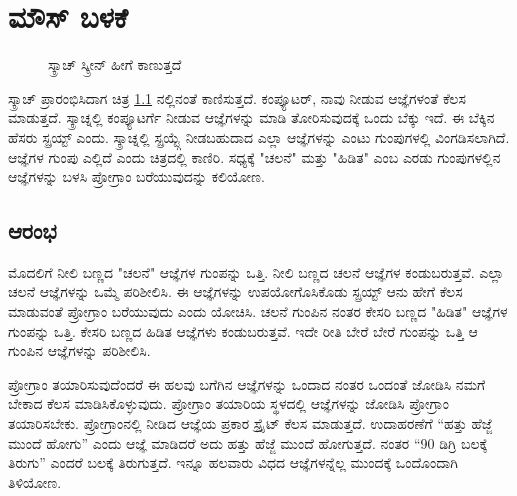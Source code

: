 \chapter{ಮೌಸ್ ಬಳಕೆ}
\begin{center}
\begin{figure}[h]
\caption{ಸ್ಕ್ರಾಚ್ ಸ್ಕ್ರೀನ್ ಹೀಗೆ ಕಾಣುತ್ತದೆ}
\label{ScratchScreen}
\end{figure}
\end{center}

ಸ್ಕ್ರಾಚ್ ಪ್ರಾರಂಭಿಸಿದಾಗ ಚಿತ್ರ \ref{ScratchScreen} ನಲ್ಲಿನಂತೆ ಕಾಣಿಸುತ್ತದೆ. ಕಂಪ್ಯೂಟರ್, ನಾವು ನೀಡುವ ಆಜ್ಞೆಗಳಂತೆ ಕೆಲಸ ಮಾಡುತ್ತದೆ.  ಸ್ಕ್ರಾಚ್ನಲ್ಲಿ ಕಂಪ್ಯೂಟರ್ಗೆ ನೀಡುವ ಆಜ್ಞೆಗಳನ್ನು ಮಾಡಿ ತೋರಿಸುವುದಕ್ಕೆ ಒಂದು ಬೆಕ್ಕು ಇದೆ. ಈ ಬೆಕ್ಕಿನ ಹೆಸರು ಸ್ಪ್ರಯ್ಟ್ ಎಂದು. ಸ್ಕ್ರಾಚ್ನಲ್ಲಿ ಸ್ಪ್ರಯ್ಟ್ಗೆ ನೀಡಬಹುದಾದ ಎಲ್ಲಾ ಆಜ್ಞೆಗಳನ್ನು ಎಂಟು ಗುಂಪುಗಳಲ್ಲಿ ವಿಂಗಡಿಸಲಾಗಿದೆ.  ಆಜ್ಞೆಗಳ ಗುಂಪು ಎಲ್ಲಿದೆ ಎಂದು ಚಿತ್ರದಲ್ಲಿ ಕಾಣಿರಿ. ಸಧ್ಯಕ್ಕೆ "ಚಲನೆ" ಮತ್ತು "ಹಿಡಿತ" ಎಂಬ ಎರಡು ಗುಂಪುಗಳಲ್ಲಿನ  ಆಜ್ಞೆಗಳನ್ನು ಬಳಸಿ ಪ್ರೋಗ್ರಾಂ ಬರೆಯುವುದನ್ನು ಕಲಿಯೋಣ.
\section{ಆರಂಭ}

ಮೊದಲಿಗೆ ನೀಲಿ ಬಣ್ಣದ "ಚಲನೆ" ಆಜ್ಞೆಗಳ ಗುಂಪನ್ನು ಒತ್ತಿ.  ನೀಲಿ ಬಣ್ಣದ ಚಲನೆ ಆಜ್ಞೆಗಳ ಕಂಡುಬರುತ್ತವೆ.  ಎಲ್ಲಾ ಚಲನೆ ಆಜ್ಞೆಗಳನ್ನು ಒಮ್ಮೆ ಪರಿಶೀಲಿಸಿ. ಈ ಆಜ್ಞೆಗಳನ್ನು  ಉಪಯೋಗೊಸಿಕೊಡು ಸ್ಪ್ರಯ್ಟ್ ಆನು ಹೇಗೆ ಕೆಲಸ ಮಾಡುವಂತೆ ಪ್ರೋಗ್ರಾಂ ಬರೆಯುವುದು ಎಂದು ಯೋಚಿಸಿ.  ಚಲನೆ ಗುಂಪಿನ ನಂತರ ಕೇಸರಿ ಬಣ್ಣದ "ಹಿಡಿತ" ಆಜ್ಞೆಗಳ ಗುಂಪನ್ನು ಒತ್ತಿ.  ಕೇಸರಿ ಬಣ್ಣದ ಹಿಡಿತ ಆಜ್ಞೆಗಳು ಕಂಡುಬರುತ್ತವೆ.  ಇದೇ ರೀತಿ ಬೇರೆ ಬೇರೆ ಗುಂಪನ್ನು ಒತ್ತಿ ಆ ಗುಂಪಿನ ಆಜ್ಞೆಗಳನ್ನು ಪರಿಶೀಲಿಸಿ.

ಪ್ರೋಗ್ರಾಂ ತಯಾರಿಸುವುದೆಂದರೆ ಈ ಹಲವು ಬಗೆಗಿನ ಆಜ್ಞೆಗಳನ್ನು ಒಂದಾದ ನಂತರ ಒಂದಂತೆ ಜೋಡಿಸಿ ನಮಗೆ ಬೇಕಾದ ಕೆಲಸ ಮಾಡಿಸಿಕೊಳ್ಳುವುದು. ಪ್ರೋಗ್ರಾಂ ತಯಾರಿಯ ಸ್ಥಳದಲ್ಲಿ ಆಜ್ಞೆಗಳನ್ನು ಜೋಡಿಸಿ ಪ್ರೋಗ್ರಾಂ ತಯಾರಿಸಬೇಕು. ಪ್ರೋಗ್ರಾಂನಲ್ಲಿ ನೀಡಿದ ಆಜ್ಞೆಯ ಪ್ರಕಾರ ಸ್ಪ್ರೈಟ್ ಕೆಲಸ ಮಾಡುತ್ತದೆ. ಉದಾಹರಣೆಗೆ “ಹತ್ತು ಹೆಜ್ಜೆ ಮುಂದೆ ಹೋಗು” ಎಂದು ಆಜ್ಞೆ ಮಾಡಿದರೆ ಅದು ಹತ್ತು ಹೆಜ್ಜೆ ಮುಂದೆ ಹೋಗುತ್ತದೆ. ನಂತರ “90 ಡಿಗ್ರಿ ಬಲಕ್ಕೆ ತಿರುಗು” ಎಂದರೆ ಬಲಕ್ಕೆ ತಿರುಗುತ್ತದೆ. ಇನ್ನೂ ಹಲವಾರು ವಿಧದ ಆಜ್ಞೆಗಳನ್ನೆಲ್ಲ ಮುಂದಕ್ಕೆ ಒಂದೊಂದಾಗಿ ತಿಳಿಯೋಣ.


